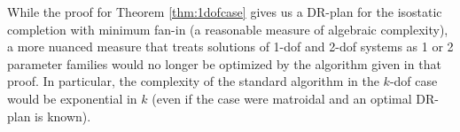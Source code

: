 \begin{remark}
\label{obs:algebraic_completion}
    While the proof for Theorem \ref{thm:1dofcase} gives us a DR-plan for the isostatic completion with minimum fan-in (a reasonable measure of algebraic complexity), a more nuanced measure that treats solutions of 1-dof and 2-dof systems as 1 or 2 parameter families would no longer be optimized by the algorithm given in that proof. In particular, the complexity of the standard algorithm in the $k$-dof case would be exponential in $k$ (even if the case were matroidal and an optimal DR-plan is known).
\end{remark}





